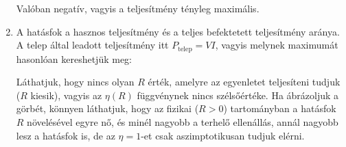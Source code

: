 \begin{enumerate}[label=\alph*),itemsep=0pt]
   Valóban negatív, vagyis a teljesítmény tényleg maximális.

  \item
   A hatásfok a hasznos teljesítmény és a teljes befektetett teljesítmény aránya. A telep által leadott teljesítmény itt $P_\text{telep}=VI$, vagyis 
   melynek maximumát hasonlóan kereshetjük meg:
   
   Láthatjuk, hogy nincs olyan $R$ érték, amelyre az egyenletet teljesíteni tudjuk ($R$ kiesik), vagyis az $\eta(R)$ függvénynek nincs szélsőértéke. Ha ábrázoljuk a görbét, könnyen láthatjuk, hogy az fizikai ($R>0$) tartományban a hatásfok $R$ növelésével egyre nő, és minél nagyobb a terhelő ellenállás, annál nagyobb lesz a hatásfok is, de az $\eta=1$-et csak aszimptotikusan tudjuk elérni. 
 \end{enumerate}

\fi